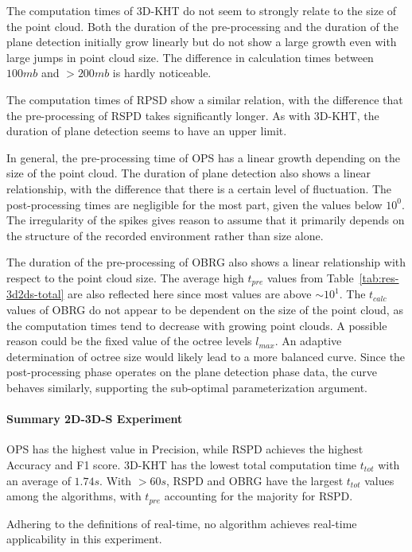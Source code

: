 \documentclass[main.tex]{subfiles}
\begin{document}
The computation times of 3D-KHT do not seem to strongly relate to the size of the point cloud.
Both the duration of the pre-processing and the duration of the plane detection initially grow linearly
but do not show a large growth even with large jumps in point cloud size.
The difference in calculation times between $100mb$ and ${>}200mb$ is hardly noticeable.

The computation times of RPSD show a similar relation, with the difference that the pre-processing of RSPD takes significantly longer.
As with 3D-KHT, the duration of plane detection seems to have an upper limit.

In general, the pre-processing time of OPS has a linear growth depending on the size of the point cloud.
The duration of plane detection also shows a linear relationship, with the difference that there is a certain level
of fluctuation. The post-processing times are negligible for the most part, given the values below $10^0$.
The irregularity of the spikes gives reason to assume that it primarily depends on the structure of the recorded
environment rather than size alone.

The duration of the pre-processing of OBRG also shows a linear relationship with respect to the point cloud size.
The average high $t_{pre}$ values from Table~\ref{tab:res-3d2ds-total} are also reflected here since most values are above ${\sim}10^1$.
The $t_{calc}$ values of OBRG do not appear to be dependent on the size of the point cloud, as the computation
times tend to decrease with growing point clouds. A possible reason could be the fixed value of the octree levels $l_{max}$.
An adaptive determination of octree size would likely lead to a more balanced curve.
Since the post-processing phase operates on the plane detection phase data, the curve behaves similarly,
supporting the sub-optimal parameterization argument.



\paragraph{Summary 2D-3D-S Experiment}
OPS has the highest value in Precision, while RSPD achieves the highest Accuracy and F1 score.
3D-KHT has the lowest total computation time $t_{tot}$ with an average of $1.74s$. With ${>}60s$,
RSPD and OBRG have the largest $t_{tot}$ values among the algorithms, with $t_{pre}$ accounting for
the majority for RSPD.

Adhering to the definitions of real-time, no algorithm achieves real-time applicability in this experiment.
\end{document}
